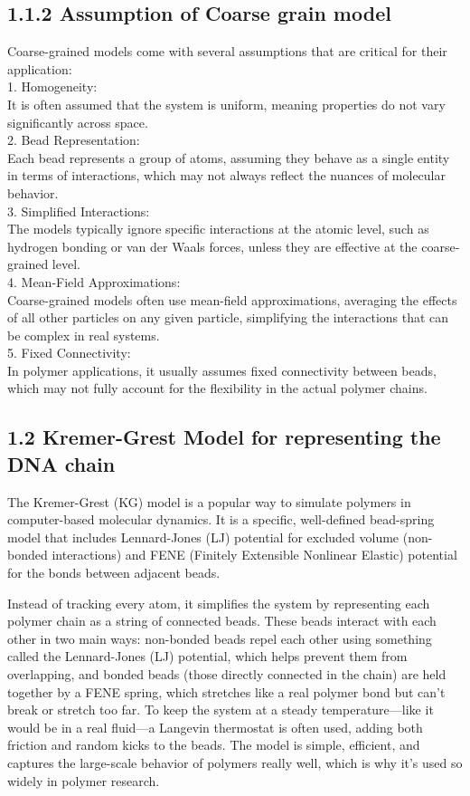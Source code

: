 \documentclass[12pt]{article}
\begin{document}
\begin{flushleft}
\subsection*{1.1.2 Assumption of Coarse grain model}
Coarse-grained models come with several assumptions that are critical for their application:\\
    1. Homogeneity:\\
    It is often assumed that the system is uniform, meaning properties do not vary significantly across space. \\
    2. Bead Representation:\\
        Each bead represents a group of atoms, assuming they behave as a single entity in terms of interactions, which may not always reflect the nuances of molecular behavior. \\
    3. Simplified Interactions:\\
        The models typically ignore specific interactions at the atomic level, such as hydrogen bonding or van der Waals forces, unless they are effective at the coarse-grained level. \\
    4. Mean-Field Approximations:\\
        Coarse-grained models often use mean-field approximations, averaging the effects of all other particles on any given particle, simplifying the interactions that can be complex in real systems. \\
    5. Fixed Connectivity:\\
        In polymer applications, it usually assumes fixed connectivity between beads, which may not fully account for the flexibility in the actual polymer chains. \\ 


\subsection*{1.2 Kremer-Grest Model for representing the DNA chain}
	
The Kremer-Grest (KG) model is a popular way to simulate polymers in computer-based molecular dynamics. It is a specific, well-defined bead-spring model that includes Lennard-Jones (LJ) potential for excluded volume (non-bonded interactions) and FENE (Finitely Extensible Nonlinear Elastic) potential for the bonds between adjacent beads.	

Instead of tracking every atom, it simplifies the system by representing each polymer chain as a string of connected beads. These beads interact with each other in two main ways: non-bonded beads repel each other using something called the Lennard-Jones (LJ) potential, which helps prevent them from overlapping, and bonded beads (those directly connected in the chain) are held together by a FENE spring, which stretches like a real polymer bond but can't break or stretch too far. To keep the system at a steady temperature—like it would be in a real fluid—a Langevin thermostat is often used, adding both friction and random kicks to the beads. The model is simple, efficient, and captures the large-scale behavior of polymers really well, which is why it's used so widely in polymer research.	
	



\end{flushleft}
\end{document}
